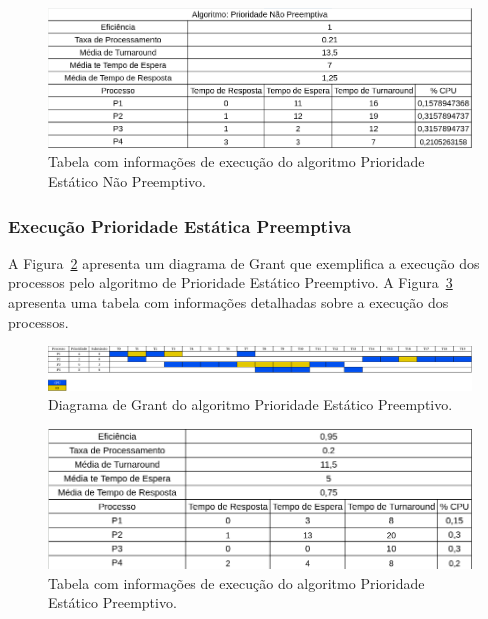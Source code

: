 \documentclass[
	12pt,				%
	oneside,   	        %
	a4paper,			%
	english,			%
	french,				%
	spanish,			%
	brazil,				%
	]{pacotes/abntex2}
\begin{document}
\begin{figure}[H]
  \centering
  \includegraphics[scale=0.5]{figuras/ex3/tabela/prio_sem_preemp.png}
  \caption{Tabela com informações de execução do algoritmo Prioridade Estático Não Preemptivo.}
  \label{fig:ex3/tabela/prio_sem_preemp}
\end{figure}

\subsubsection{Execução Prioridade Estática Preemptiva}
\label{subsubsec:prio_preemp}

A Figura~\ref{fig:ex3/diagrama/prio_preemp} apresenta um diagrama de Grant que exemplifica a execução dos processos pelo algoritmo de Prioridade Estático Preemptivo. A Figura~\ref{fig:ex3/tabela/prio_preemp} apresenta uma tabela com informações detalhadas sobre a execução dos processos. 

\begin{figure}[H]
  \centering
  \includegraphics[scale=0.20]{figuras/ex3/diagrama/prio_preemp.png}
  \caption{Diagrama de Grant do algoritmo Prioridade Estático Preemptivo.}
  \label{fig:ex3/diagrama/prio_preemp}
\end{figure}

\begin{figure}[H]
  \centering
  \includegraphics[scale=0.5]{figuras/ex3/tabela/prio_preemp.png}
  \caption{Tabela com informações de execução do algoritmo Prioridade Estático Preemptivo.}
  \label{fig:ex3/tabela/prio_preemp}
\end{figure}
\end{document}
